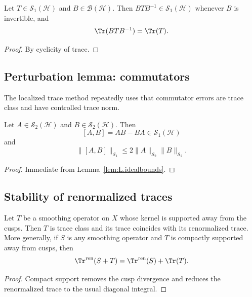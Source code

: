 \begin{lemma}
\label{lem:L.conjugation}
Let $T\in \mathcal{S}_1(\mathcal{H})$ and $B\in\mathcal{B}(\mathcal{H})$.
Then $BTB^{-1}\in\mathcal{S}_1(\mathcal{H})$ whenever $B$ is invertible, and
\[
\Tr(BTB^{-1})=\Tr(T).
\]
\end{lemma}

\begin{proof}
By cyclicity of trace.
\end{proof}

\subsection{Perturbation lemma: commutators}
\label{subsec:L.commutators}

The localized trace method repeatedly uses that commutator errors are trace class and have controlled trace norm.

\begin{lemma}
\label{lem:L.commutator}
Let $A\in\mathcal{S}_2(\mathcal{H})$ and $B\in\mathcal{S}_2(\mathcal{H})$. Then
\[
[A,B]=AB-BA\in\mathcal{S}_1(\mathcal{H})
\]
and
\[
\|[A,B]\|_{\mathcal{S}_1}
\le
2\|A\|_{\mathcal{S}_2}\|B\|_{\mathcal{S}_2}.
\]
\end{lemma}

\begin{proof}
Immediate from Lemma~\ref{lem:L.idealbounds}.
\end{proof}

\subsection{Stability of renormalized traces}
\label{subsec:L.renorm.stability}

\begin{proposition}
\label{prop:L.renorm.stability}
Let $T$ be a smoothing operator on $X$ whose kernel is supported away from the cusps.
Then $T$ is trace class and its trace coincides with its renormalized trace.
More generally, if $S$ is any smoothing operator and $T$ is compactly supported away from cusps, then
\[
\Tr^{\mathrm{ren}}(S+T)=\Tr^{\mathrm{ren}}(S)+\Tr(T).
\]
\end{proposition}

\begin{proof}
Compact support removes the cusp divergence and reduces the renormalized trace to the usual diagonal integral.
\end{proof}

